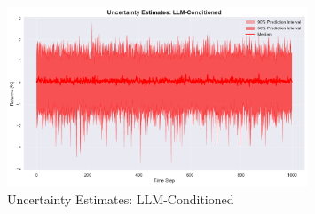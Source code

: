 \begin{figure}[htbp]
\centering
\includegraphics[width=0.8\textwidth]{figures/uncertainty_llm_conditioned.pdf}
\caption{Uncertainty Estimates: LLM-Conditioned}
\label{fig:uncertaintyllmconditioned}
\end{figure}